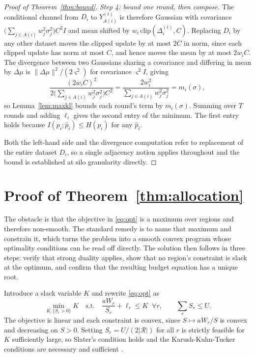 \documentclass[acmsmall,screen,review,anonymous]{acmart}
\theoremstyle{acmdefinition}%
\newcommand{\Reg}{\mathcal{R}}
\begin{document}
\begin{proof}[Proof of Theorem~\ref{thm:bound}]
\emph{Step 4: bound one round, then compose.}
The conditional channel from $D_i$ to $Y_{A(i)}^{(t)}$ is therefore Gaussian with
covariance $\big(\sum_{j \in A(i)} w_j^2 \sigma_j^2\big) C^2 I$ and mean shifted by
$w_i \,\mathrm{clip}(\Delta_i^{(t)}, C)$. Replacing $D_i$ by any other dataset
moves the clipped update by at most $2C$ in norm, since each clipped update has
norm at most $C$, and hence moves the mean by at most $2 w_i C$. The divergence
between two Gaussians sharing a covariance and differing in mean by $\Delta\mu$ is
$\|\Delta\mu\|^2 / (2\varsigma^2)$ for covariance $\varsigma^2 I$, giving
\begin{equation}
\frac{(2 w_i C)^2}{2 \big(\sum_{j \in A(i)} w_j^2 \sigma_j^2\big) C^2}
= \frac{2 w_i^2}{\sum_{j \in A(i)} w_j^2 \sigma_j^2} = m_i(\sigma),
\end{equation}
so Lemma~\ref{lem:maxkl} bounds each round's term by $m_i(\sigma)$. Summing over
$T$ rounds and adding $\ell_i$ gives the second entry of the minimum. The first
entry holds because $I(p_i ; \hat{p}_i) \le H(p_i)$ for any $\hat{p}_i$.

Both the left-hand side and the divergence computation refer to replacement of the
entire dataset $D_i$, so a single adjacency notion applies throughout and the
bound is established at silo granularity directly.
\end{proof}

\section{Proof of Theorem~\ref{thm:allocation}}
\label{app:alloc}

The obstacle is that the objective in \eqref{eq:opt} is a maximum over regions
and therefore non-smooth. The standard remedy is to name that maximum and
constrain it, which turns the problem into a smooth convex program whose
optimality conditions can be read off directly. The solution then follows in
three steps: verify that strong duality applies, show that no region's
constraint is slack at the optimum, and confirm that the resulting budget
equation has a unique root.

Introduce a slack variable $K$ and rewrite \eqref{eq:opt} as
\begin{equation}
\min_{K, \{S_r > 0\}} K
\quad \text{s.t.} \quad
\frac{a W_r}{S_r} + \ell_r \le K \;\; \forall r,
\qquad \sum_r S_r \le U .
\label{eq:convex}
\end{equation}
The objective is linear and each constraint is convex, since $S \mapsto aW_r/S$ is
convex and decreasing on $S > 0$. Setting $S_r = U / (2 |\Reg|)$ for all $r$ is
strictly feasible for $K$ sufficiently large, so Slater's condition holds and the
Karush-Kuhn-Tucker conditions are necessary and sufficient
\cite{boyd2004convex}.
\end{document}
